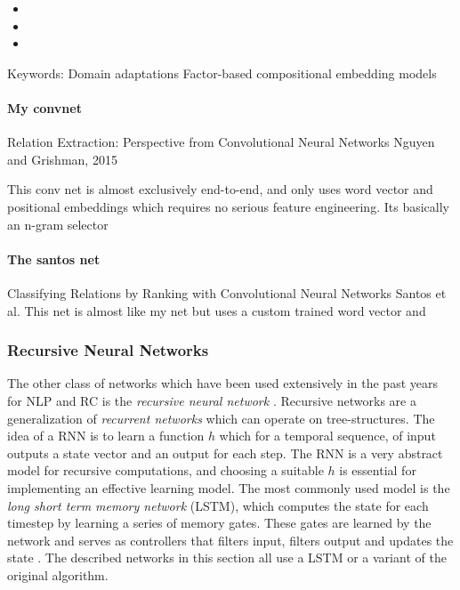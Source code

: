 \begin{itemize}

\item   

\item

\item


\end{itemize}

Keywords: 
Domain adaptations
Factor-based compositional embedding
models


\paragraph{My convnet}
Relation Extraction:
Perspective from Convolutional Neural Networks
Nguyen and Grishman, 2015

This conv net is almost exclusively end-to-end, and only uses word vector and positional 
embeddings which requires no serious feature engineering.
Its basically an n-gram selector

\paragraph{The santos net}
Classifying Relations by Ranking with Convolutional Neural Networks
Santos et al.
This net is almost like my net but uses a custom trained word vector and 

\subsubsection{Recursive Neural Networks}

The other class of networks which have been used extensively in the past years for NLP and RC is the \emph{recursive neural network} \cite{pollack1990}. Recursive networks are a generalization of \emph{recurrent networks} \cite{elman1990} which can operate on tree-structures. The idea of a RNN is to learn a function $h$ which for a temporal sequence, of input outputs a state vector and an output for each step. The RNN is a very abstract model for recursive computations, and choosing a suitable $h$ is essential for implementing an effective learning model. The most commonly used model is the \emph{long short term memory network} (LSTM), which computes the state for each timestep by learning a series of memory gates. These gates are learned by the network and serves as controllers that filters input, filters output and updates the state \cite{schmidhuber2003}. The described networks in this section all use a LSTM or a variant of the original algorithm.

